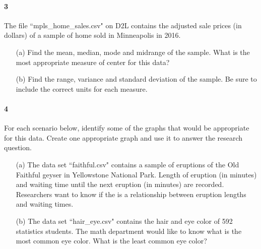 \documentclass{article}
\begin{document}
\begin{flushleft}
\paragraph{3} The file ``mpls\_home\_sales.csv" on D2L contains the adjusted sale prices (in dollars) of a sample of home sold in Minneapolis in 2016. 
\begin{itemize}
\item [(a)] Find the mean, median, mode and midrange of the sample. What is the most appropriate measure of center for this data?
\vspace{3in}
\item[(b)] Find the range, variance and standard deviation of the sample. Be sure to include the correct units for each measure.
\vspace{3in}
\end{itemize}


\newpage
\paragraph{4} For each scenario below, identify some of the graphs that would be appropriate for this data. Create one appropriate graph and use it to answer the research question.

\begin{itemize}
\item [(a)] The data set ``faithful.csv" contains a sample of eruptions of the Old Faithful geyser in Yellowstone National Park. Length of eruption (in minutes) and waiting time until the next eruption (in minutes) are recorded. Researchers want to know if the is a relationship between eruption lengths and waiting times.
\vspace{3in}
\item[(b)] The data set ``hair\_eye.csv" contains the hair and eye color of 592 statistics students. The math department would like to know what is the most common eye color. What is the least common eye color?
\vspace{2in}
\end{itemize}


\end{flushleft}
\end{document}
